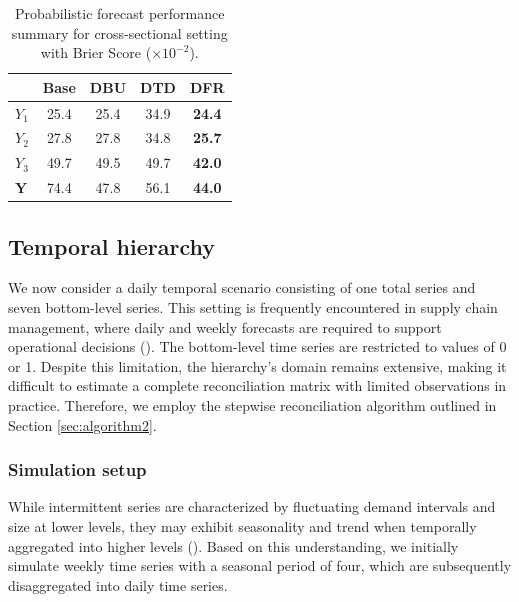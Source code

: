 \documentclass[a4paper,review,12pt,authoryear]{elsarticle}
\newcommand{\bY}{\mathbf{Y}}
\begin{document}
    \begin{table}
      \centering
      \caption{\label{tab:sim_crosssectional_res_dist} Probabilistic forecast performance summary for cross-sectional setting with Brier Score ($\times 10^{-2}$).}
      \begin{tabular}{lcccc}
      \toprule
      & Base & DBU & DTD & DFR \\\midrule
      $Y_1$ & 25.4 & 25.4 & 34.9 & \textbf{24.4} \\
      $Y_2$ & 27.8 & 27.8 & 34.8 & \textbf{25.7}\\
      $Y_3$ & 49.7 & 49.5 & 49.7 & \textbf{42.0} \\
      $\bY$ & 74.4 & 47.8 & 56.1 & \textbf{44.0} \\
      \bottomrule
      \end{tabular}
    \end{table}


     \subsection{Temporal hierarchy}

     We now consider a daily temporal scenario consisting of one total series and seven bottom-level series.
     This setting is frequently encountered in supply chain management, where daily and weekly forecasts are required to support operational decisions (\citealp{syntetosSupplyChainForecasting2016}).
     The bottom-level time series are restricted to values of 0 or 1.
     Despite this limitation, the hierarchy's domain remains extensive, making it difficult to estimate a complete reconciliation matrix with limited observations in practice.
     Therefore, we employ the stepwise reconciliation algorithm outlined in Section \ref{sec:algorithm2}.

     \subsubsection{Simulation setup}

     While intermittent series are characterized by fluctuating demand intervals and size at lower levels, they may exhibit seasonality and trend when temporally aggregated into higher levels ().
     Based on this understanding, we initially simulate weekly time series with a seasonal period of four, which are subsequently disaggregated into daily time series.
\end{document}
